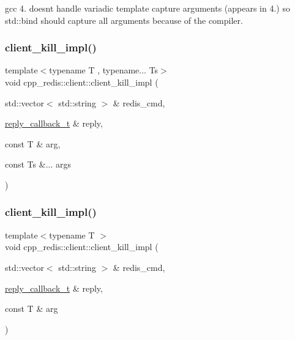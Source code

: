 gcc 4. doesn\textquotesingle{}t handle variadic template capture arguments (appears in 4.) so std\+::bind should capture all arguments because of the compiler. \mbox{\label{classcpp__redis_1_1client_a1f895140bce1499fabc1fb2fb4d6600d}} 
\subsubsection{\texorpdfstring{client\+\_\+kill\+\_\+impl()}{client\_kill\_impl()}\hspace{0.1cm}{\footnotesize\ttfamily [1/2]}}
{\footnotesize\ttfamily template$<$typename T , typename... Ts$>$ \\
void cpp\+\_\+redis\+::client\+::client\+\_\+kill\+\_\+impl (\begin{DoxyParamCaption}\item[{std\+::vector$<$ std\+::string $>$ \&}]{redis\+\_\+cmd,  }\item[{\hyperlink{classcpp__redis_1_1client_a061a1140d36d2eaeda82b09a0bb3f9f2}{reply\+\_\+callback\+\_\+t} \&}]{reply,  }\item[{const T \&}]{arg,  }\item[{const Ts \&...}]{args }\end{DoxyParamCaption})\hspace{0.3cm}{\ttfamily [private]}}

\mbox{\label{classcpp__redis_1_1client_a1d40b08734a2ed59a5b09739c5f32fae}} 
\subsubsection{\texorpdfstring{client\+\_\+kill\+\_\+impl()}{client\_kill\_impl()}\hspace{0.1cm}{\footnotesize\ttfamily [2/2]}}
{\footnotesize\ttfamily template$<$typename T $>$ \\
void cpp\+\_\+redis\+::client\+::client\+\_\+kill\+\_\+impl (\begin{DoxyParamCaption}\item[{std\+::vector$<$ std\+::string $>$ \&}]{redis\+\_\+cmd,  }\item[{\hyperlink{classcpp__redis_1_1client_a061a1140d36d2eaeda82b09a0bb3f9f2}{reply\+\_\+callback\+\_\+t} \&}]{reply,  }\item[{const T \&}]{arg }\end{DoxyParamCaption})\hspace{0.3cm}{\ttfamily [private]}}

